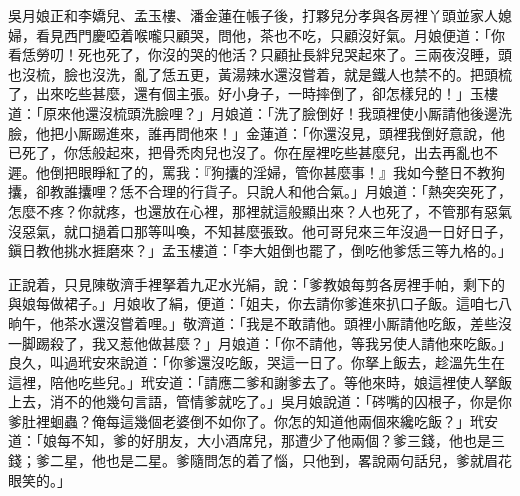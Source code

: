 吳月娘正和李嬌兒、孟玉樓、潘金蓮在帳子後，打夥兒分孝與各房裡丫頭並家人媳婦，看見西門慶啞着喉嚨只顧哭，問他，茶也不吃，只顧沒好氣。月娘便道：「你看恁勞叨！死也死了，你沒的哭的他活？只顧扯長絆兒哭起來了。三兩夜沒睡，頭也沒梳，臉也沒洗，亂了恁五更，黃湯辣水還沒嘗着，就是鐵人也禁不的。{}把頭梳了，出來吃些甚麼，還有個主張。好小身子，一時摔倒了，卻怎樣兒的！」玉樓道：「原來他還沒梳頭洗臉哩？」{}月娘道：「洗了臉倒好！我頭裡使小厮請他後邊洗臉，他把小厮踢進來，誰再問他來！」金蓮道：「你還沒見，頭裡我倒好意說，他已死了，你恁般起來，把骨禿肉兒也沒了。你在屋裡吃些甚麼兒，出去再亂也不遲。他倒把眼睜紅了的，罵我：『狗攮的淫婦，管你甚麼事！』我如今整日不教狗攮，卻教誰攮哩？恁不合理的行貨子。只說人和他合氣。」{}月娘道：「熱突突死了，怎麼不疼？{}你就疼，也還放在心裡，那裡就這般顯出來？人也死了，不管那有惡氣沒惡氣，就口撾着口那等叫喚，不知甚麼張致。他可哥兒來三年沒過一日好日子，鎭日教他挑水捱磨來？」{}孟玉樓道：「李大姐倒也罷了，{}倒吃他爹恁三等九格的。」

正說着，只見陳敬濟手裡拏着九疋水光絹，說：「爹教娘每剪各房裡手帕，剩下的與娘每做裙子。」月娘收了絹，便道：「姐夫，你去請你爹進來扒口子飯。這咱七八晌午，他茶水還沒嘗着哩。」敬濟道：「我是不敢請他。頭裡小厮請他吃飯，差些沒一脚踢殺了，{}我又惹他做甚麼？」月娘道：「你不請他，等我另使人請他來吃飯。」良久，叫過玳安來說道：「你爹還沒吃飯，哭這一日了。你拏上飯去，趁溫先生在這裡，陪他吃些兒。」玳安道：「請應二爹和謝爹去了。等他來時，娘這裡使人拏飯上去，消不的他幾句言語，管情爹就吃了。」吳月娘說道：「硶嘴的囚根子，你是你爹肚裡蛔蟲？俺每這幾個老婆倒不如你了。你怎的知道他兩個來纔吃飯？」玳安道：「娘每不知，爹的好朋友，大小酒席兒，那遭少了他兩個？爹三錢，他也是三錢；爹二星，他也是二星。爹隨問怎的着了惱，只他到，畧說兩句話兒，爹就眉花眼笑的。」

